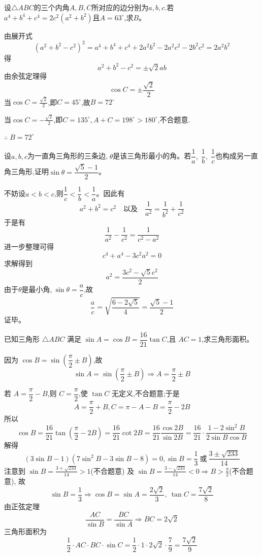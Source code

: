 \begin{questions}
    \question 设$\triangle ABC$的三个内角$A,B,C$所对应的边分别为$a,b,c$.若$a^4+b^4+c^4=2c^2(a^2+b^2)$且$A=63^\circ$,求$B$。
    \begin{solution}
        由展开式
        $$(a^2+b^2-c^2)^2 = a^4+b^4+c^4+2a^2b^2-2a^2c^2-2b^2c^2 = 2a^2b^2$$
        得$$a^2+b^2-c^2 = \pm\sqrt{2}ab$$
        由余弦定理得$$ \cos C = \pm\frac{\sqrt{2}}{2}$$
        当$\cos C=\frac{\sqrt{2}}{2}$,即$C=45^\circ$,故$B=72^\circ$
        
        当$\cos C=-\frac{\sqrt{2}}{2}$,即$C=135^\circ,A+C=198^\circ>180^\circ$,不合题意.
        
        $\therefore \;B=72^\circ$
    \end{solution}

    \question 设$a,b,c$为一直角三角形的三条边,$\;\theta$是该三角形最小的角。若$\dfrac{1}{a},\;\dfrac{1}{b},\;\dfrac{1}{c}$也构成另一直角三角形,证明$\sin\theta=\dfrac{\sqrt{5}-1}{2}$。
    \begin{solution}
        不妨设$a<b<c$,则$\dfrac{1}{c}<\dfrac{1}{b}<\dfrac{1}{a}$。因此有
        \[
        a^2+b^2=c^2 \quad \text{以及} \quad \frac{1}{a^2}=\frac{1}{b^2}+\frac{1}{c^2}
        \]
        于是有
        \[
        \frac{1}{a^2}-\frac{1}{c^2}=\frac{1}{c^2-a^2}
        \]
        进一步整理可得
        \[
        c^{4}+a^{4}-3c^2a^2=0
        \]
        求解得到
        \[
        a^2=\frac{3c^2-\sqrt{5}c^2}{2}
        \]
        由于$\theta$是最小角,$\ \sin\theta=\dfrac{a}{c}$,故
        \[
        \frac{a}{c}=\sqrt{\frac{6-2\sqrt{5}}{4}}=\frac{\sqrt{5}-1}{2}
        \]
        证毕。
    \end{solution}
    
    \question 已知三角形 $\triangle ABC$ 满足 $\sin A = \cos B = \dfrac{16}{21}\tan C$,且 ${AC} = 1$,求三角形面积。
    \begin{solution}
        因为 $\cos B = \sin\left(\dfrac{\pi}{2} \pm B\right)$,故
        \[
        \sin A = \sin\left(\frac{\pi}{2} \pm B\right)\Rightarrow A=\frac{\pi}{2} \pm B
        \]
        
        若 $ A = \dfrac{\pi}{2} - B$,则 $ C = \dfrac{\pi}{2}$,使 $\tan C$ 无定义,不合题意;于是
        \[
         A = \frac{\pi}{2} + B ,C = \pi -  A -  B = \frac{\pi}{2} - 2B
        \]
        所以
        \[
        \cos B = \frac{16}{21} \tan\left(\frac{\pi}{2} - 2B\right) = \frac{16}{21} \cot 2B = \frac{16}{21} \frac{\cos 2B}{\sin 2B}=\frac{16}{21}\cdot\frac{1-2\sin^{2}B}{2\sin B\cos B}
        \]
        解得
        $$(3\sin B-1)(7\sin^{2}B-3\sin B-8)=0,\sin B=\frac{1}{3}\ \text{或}\ \frac{3\pm\sqrt{233}}{14}$$ 
        注意到 $\sin B=\frac{3+\sqrt{233}}{14}>1$(不合题意) 及 $\sin B=\frac{3-\sqrt{233}}{14}<0\Rightarrow B>\frac{\pi}{2}$(不合题意), 故
        \[
        \sin B=\frac{1}{3}\Rightarrow \cos B = \sin A = \frac{2\sqrt{2}}{3}, \ \tan C = \frac{7\sqrt{2}}{8}
        \]
        由正弦定理
        \[
        \frac{{AC}}{\sin B} = \frac{{BC}}{\sin A} \Rightarrow {BC} = 2\sqrt{2}
        \]
        三角形面积为
        \[
        \frac{1}{2} \cdot {AC} \cdot {BC} \cdot \sin C = \frac{1}{2} \cdot 1 \cdot 2\sqrt{2} \cdot \frac{7}{9} = \frac{7\sqrt{2}}{9}
        \]
    \end{solution}
    

\end{questions}
